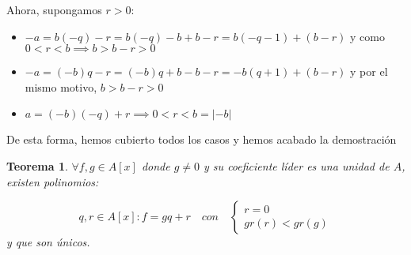 \documentclass[11pt, a4paper, titlepage]{article}
\makeatletter
\renewenvironment{proof}[1][\proofname] {\vspace{-15pt}\par\pushQED{\qed}\normalfont\topsep6\p@\@plus6\p@\relax\trivlist\item[\hskip\labelsep\it#1\@addpunct{.}]\ignorespaces}{\popQED\endtrivlist\@endpefalse}
\providecommand{\abs}[1]{\lvert#1\rvert}
\theoremstyle{theorem-style}
\newtheorem*{nth}{Teorema}
\theoremstyle{definition-style}
\theoremstyle{remark-style}
\theoremstyle{example-style}
\makeatother
\begin{document}
\begin{proof}
Ahora, supongamos $r > 0$:

\begin{itemize}
	\item $-a = b(-q) -r = b(-q) -b + b -r = b(-q-1) +(b-r)$ y como $0 < r < b \implies b > b-r > 0$
	\item $-a = (-b)q -r = (-b)q + b - b -r = -b(q+1) + (b-r)$ y por el mismo motivo, $b > b-r > 0$
	\item $a = (-b)(-q) +r \implies 0 < r < b = \abs{-b}$
\end{itemize}

De esta forma, hemos cubierto todos los casos y hemos acabado la demostración
\end{proof}

\begin{nth}
		$\forall f,g \in A[x]$ donde $g \neq 0 $ y su coeficiente líder es una unidad de $A$, existen polinomios:
	
	\[
	q,r \in A[x] : f = gq + r \quad con \quad
	 \begin{cases}
		r = 0\\
		gr(r) < gr(g)
	\end{cases}
	\]
	y que son únicos.
\end{nth}
\end{document}
